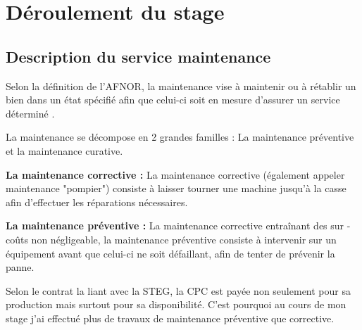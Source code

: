 \chapter{Déroulement du stage}

\section{Description du service maintenance}
Selon la définition de l'AFNOR, la maintenance vise à maintenir ou à rétablir un bien dans un état spécifié afin que celui-ci soit en mesure d'assurer un service déterminé \cite{wiki1}.

La maintenance se décompose en 2 grandes familles : La maintenance préventive et la maintenance curative.

\textbf{La maintenance corrective : }La maintenance corrective (également appeler maintenance "pompier") consiste à laisser tourner une machine jusqu'à la casse afin d'effectuer les réparations nécessaires.

\textbf{La maintenance préventive : }La maintenance corrective entraînant des sur -coûts non négligeable, la maintenance préventive consiste à intervenir sur un équipement avant que celui-ci ne soit défaillant, afin de tenter de prévenir la panne. 

Selon le contrat la liant avec la STEG, la CPC est payée non seulement pour sa production mais surtout pour sa disponibilité. C'est pourquoi au cours de mon stage j'ai effectué plus de travaux de maintenance préventive que corrective.
